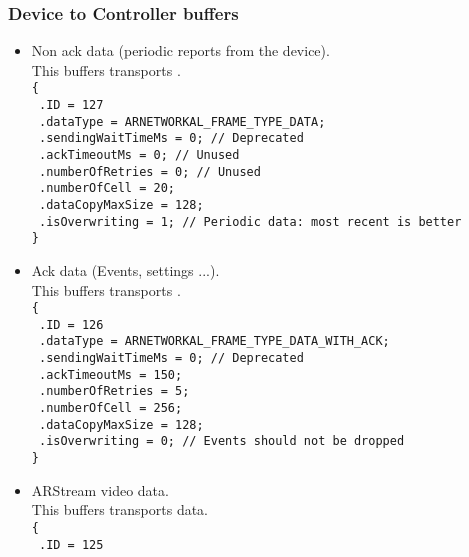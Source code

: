 \subsubsection*{Device to Controller buffers}
\begin{itemize}
\item{
    Non ack data (periodic reports from the device).\\
    This buffers transports .\\
    \texttt{\{}\\
    \texttt{  .ID = 127}\\
    \texttt{  .dataType = ARNETWORKAL\_FRAME\_TYPE\_DATA;}\\
    \texttt{  .sendingWaitTimeMs = 0; // Deprecated}\\
    \texttt{  .ackTimeoutMs = 0; // Unused}\\
    \texttt{  .numberOfRetries = 0; // Unused}\\
    \texttt{  .numberOfCell = 20;}\\
    \texttt{  .dataCopyMaxSize = 128;}\\
    \texttt{  .isOverwriting = 1; // Periodic data: most recent is better}\\
    \texttt{\}}
}
\item{
    Ack data (Events, settings ...).\\
    This buffers transports .\\
    \texttt{\{}\\
    \texttt{  .ID = 126}\\
    \texttt{  .dataType = ARNETWORKAL\_FRAME\_TYPE\_DATA\_WITH\_ACK;}\\
    \texttt{  .sendingWaitTimeMs = 0; // Deprecated}\\
    \texttt{  .ackTimeoutMs = 150;}\\
    \texttt{  .numberOfRetries = 5;}\\
    \texttt{  .numberOfCell = 256;}\\
    \texttt{  .dataCopyMaxSize = 128;}\\
    \texttt{  .isOverwriting = 0; // Events should not be dropped}\\
    \texttt{\}}
}
\item{
    ARStream video data.\\
    This buffers transports  data.\\
    \texttt{\{}\\
    \texttt{  .ID = 125}\\
}
\end{itemize}
